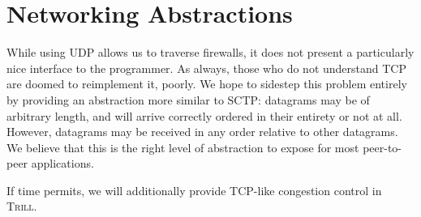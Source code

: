 \documentclass[12pt]{article}
\newcommand{\Trill}{\textsc{Trill}\xspace}
\begin{document}
\section*{Networking Abstractions}
While using UDP allows us to traverse firewalls, it does not present a
particularly nice interface to the programmer. As always, those who do not
understand TCP are doomed to reimplement it, poorly. We hope to sidestep this
problem entirely by providing an abstraction more similar to SCTP: datagrams may
be of arbitrary length, and will arrive correctly ordered in their entirety or
not at all. However, datagrams may be received in any order relative to other
datagrams. We believe that this is the right level of abstraction to expose for
most peer-to-peer applications.

If time permits, we will additionally provide TCP-like congestion control in
\Trill.
\end{document}
